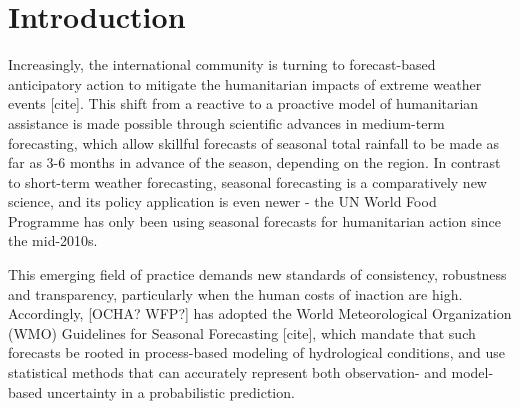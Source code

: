 \documentclass{ametsocV5}
\begin{document}




\section{Introduction}


Increasingly, the international community is turning to forecast-based anticipatory action to mitigate the humanitarian impacts of extreme weather events [cite]. This shift from a reactive to a proactive model of humanitarian assistance is made possible through scientific advances in medium-term forecasting, which allow skillful forecasts of seasonal total rainfall to be made as far as 3-6 months in advance of the season, depending on the region. In contrast to short-term weather forecasting, seasonal forecasting is a comparatively new science, and its policy application is even newer - the UN World Food Programme has only been using seasonal forecasts for humanitarian action since the mid-2010s. 

This emerging field of practice demands new standards of consistency, robustness and transparency, particularly when the human costs of inaction are high. Accordingly, [OCHA? WFP?] has adopted the World Meteorological Organization (WMO) Guidelines for Seasonal Forecasting [cite], which mandate that such forecasts be rooted in process-based modeling of hydrological conditions, and use statistical methods that can accurately represent both observation- and model-based uncertainty in a probabilistic prediction.  
\end{document}
